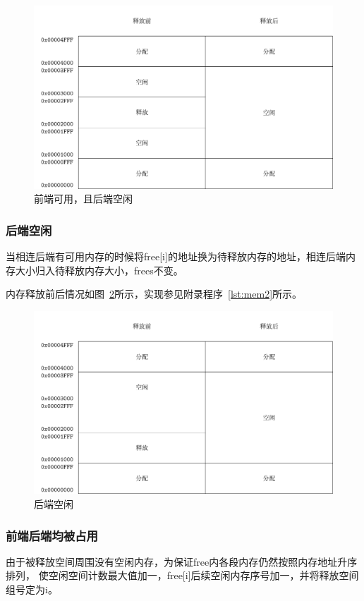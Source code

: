 \begin{figure}[h]
  \centering
  \includegraphics[width=.7\textwidth]{../Fig/mem1.pdf}
  \caption{前端可用，且后端空闲}
  \label{fig:mem1}
\end{figure}


\subsubsection{后端空闲}

当相连后端有可用内存的时候将free[i]的地址换为待释放内存的地址，相连后端内存大小归入待释放内存大小，frees不变。

内存释放前后情况如图~\ref{fig:mem2}所示，实现参见附录程序~\ref{lst:mem2}所示。

\begin{figure}[h]
  \centering
  \includegraphics[width=.7\textwidth]{../Fig/mem2.pdf}
  \caption{后端空闲}
  \label{fig:mem2}
\end{figure}


\subsubsection{前端后端均被占用}

由于被释放空间周围没有空闲内存，为保证free内各段内存仍然按照内存地址升序排列，
使空闲空间计数最大值加一，free[i]后续空闲内存序号加一，并将释放空间组号定为i。

